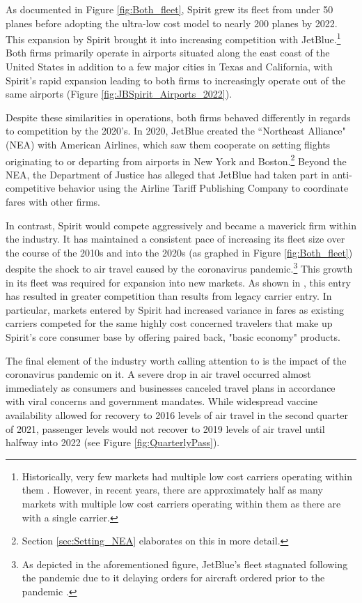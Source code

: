 \documentclass{article}
\begin{document}
	 As documented in Figure \ref{fig:Both_fleet}, Spirit grew its fleet from under 50 planes before adopting the ultra-low cost model to nearly 200 planes by 2022. This expansion by Spirit brought it into increasing competition with JetBlue.\footnote{Historically, very few markets had multiple low cost carriers operating within them \citep{kwoka_fringe_2016, ciliberto_market_2021}. However, in recent years, there are approximately half as many markets with multiple low cost carriers operating within them as there are with a single carrier.} Both firms primarily operate in airports situated along the east coast of the United States in addition to a few major cities in Texas and California, with Spirit's rapid expansion leading to both firms to increasingly operate out of the same airports (Figure \ref{fig:JBSpirit_Airports_2022}).
	
	Despite these similarities in operations, both firms behaved differently in regards to competition by the 2020's.  In 2020, JetBlue created the ``Northeast Alliance" (NEA) with American Airlines, which saw them cooperate on setting flights originating to or departing from airports in New York and Boston.\footnote{Section \ref{sec:Setting_NEA} elaborates on this in more detail.} Beyond the NEA, the Department of Justice has alleged that JetBlue had taken part in anti-competitive behavior using the Airline Tariff Publishing Company to coordinate fares with other firms. 
	
	In contrast, Spirit would compete aggressively and became a maverick firm within the industry. It has maintained a consistent pace of increasing its fleet size over the course of the 2010s and into the 2020s (as graphed in Figure \ref{fig:Both_fleet}) despite the shock to air travel caused by the coronavirus pandemic.\footnote{As depicted in the aforementioned figure, JetBlue's fleet stagnated following the pandemic due to it delaying orders for aircraft ordered prior to the pandemic \citep{bellamy_iii_jetblue_2020, sipinski_jetblue_2020}.} This growth in its fleet was required for expansion into new markets. As shown in \citet{shrago_spirit_2024}, this entry has resulted in greater competition than results from legacy carrier entry. In particular, markets entered by Spirit had increased variance in fares as existing carriers competed for the same highly cost concerned travelers that make up Spirit's core consumer base by offering paired back, "basic economy" products.
	
	The final element of the industry worth calling attention to is the impact of the coronavirus pandemic on it.  A severe drop in air travel occurred almost immediately as consumers and businesses canceled travel plans in accordance with viral concerns and government mandates. While widespread vaccine availability allowed for recovery to 2016 levels of air travel in the second quarter of 2021, passenger levels would not recover to 2019 levels of air travel until halfway into 2022 (see Figure \ref{fig:QuarterlyPass}). 
\end{document}
